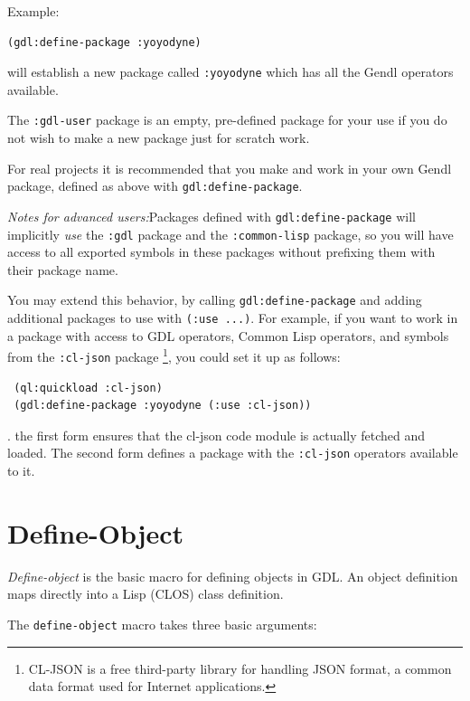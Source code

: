 \documentclass [11pt]{book}
\begin{document}
Example:

\begin{verbatim}(gdl:define-package :yoyodyne)
\end{verbatim} will establish a new package called \texttt{:yoyodyne} which has all the Gendl operators available.



The \texttt{:gdl-user} package is an empty, pre-defined package for your use if
you do not wish to make a new package just for scratch work.



For real projects it is recommended that you make and work in your own
Gendl package, defined as above with \texttt{gdl:define-package}.



\emph{Notes for advanced users:}Packages defined with \texttt{gdl:define-package} will implicitly \emph{use} the \texttt{:gdl} package and the \texttt{:common-lisp} package, so you will have access to all exported symbols
  in these packages without prefixing them with their package name.

  You may extend this behavior, by calling \texttt{gdl:define-package} and adding additional packages to use with \texttt{(:use ...)}.  For example, if  you want to work in a package with access to GDL operators,
 Common Lisp operators, and symbols from the \texttt{:cl-json} package \footnote{CL-JSON is a free third-party library for handling JSON format, a common data format used 
for Internet applications.}, you could set it up as follows:

\begin{verbatim} (ql:quickload :cl-json)
 (gdl:define-package :yoyodyne (:use :cl-json))
\end{verbatim}. the first form ensures that the cl-json code module is actually  fetched and loaded. The second form
defines a package with the \texttt{:cl-json} operators available to it.



\section{Define-Object}

\label{sec:define-object}

\emph{Define-object} is the basic macro for defining objects in GDL. An object 
definition maps directly into a Lisp (CLOS) class definition. 

The \texttt{define-object} macro takes three basic arguments:
\end{document}
